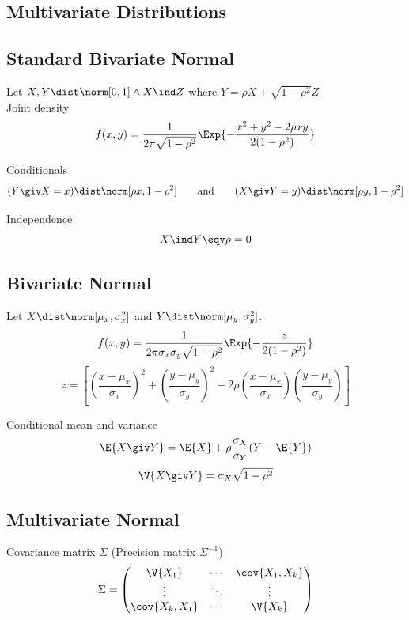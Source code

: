 \documentclass[landscape]{article}
\begin{document}
\begin{multicols*}{2}
\section{Multivariate Distributions}

\subsection{Standard Bivariate Normal}

Let $X,Y\dist\norm[0,1] \wedge X\ind Z$ where
$Y = \rho X + \sqrt{1-\rho^2}Z$\\

Joint density
\[
f(x,y) = \frac{1}{2 \pi \sqrt{1-\rho^2}}
\Exp{-\frac{x^2 + y^2 - 2\rho x y}{2 (1-\rho^2)}}
\]

Conditionals
\[
(Y\giv X=x) \dist \norm[\rho x,1-\rho^2] \qquad\text{and}\qquad
(X\giv Y=y) \dist \norm[\rho y,1-\rho^2]
\]

Independence
\[X \ind Y \eqv \rho = 0\]

\subsection{Bivariate Normal}

Let $X\dist\norm[\mu_x,\sigma_x^2]$
  and $Y\dist\norm[\mu_y,\sigma_y^2]$.
\[f(x,y) = \frac{1}{2 \pi \sigma_x \sigma_y \sqrt{1-\rho^2}}
\Exp{-\frac{z}{2 (1-\rho^2)}}\]
\[ z =
  \left[
  \left(\frac{x-\mu_x}{\sigma_x}\right)^2
    + \left(\frac{y-\mu_y}{\sigma_y}\right)^2
    - 2\rho\left(\frac{x-\mu_x}{\sigma_x}\right)
      \left(\frac{y-\mu_y}{\sigma_y}\right)
  \right]
\]

Conditional mean and variance
\[\E{X\giv Y} = \E{X} + \rho\frac{\sigma_X}{\sigma_Y}(Y-\E{Y})\]
\[\V{X\giv Y} = \sigma_X \sqrt{1-\rho^2}\]

\subsection{Multivariate Normal}

Covariance matrix $\Sigma$ \quad (Precision matrix $\Sigma^{-1}$)
\[\Sigma =
  \begin{pmatrix}
  \V{X_1} & \cdots & \cov{X_1,X_k} \\
  \vdots & \ddots & \vdots \\
  \cov{X_k,X_1} & \cdots & \V{X_k}
  \end{pmatrix}\]


\end{multicols*}
\end{document}
